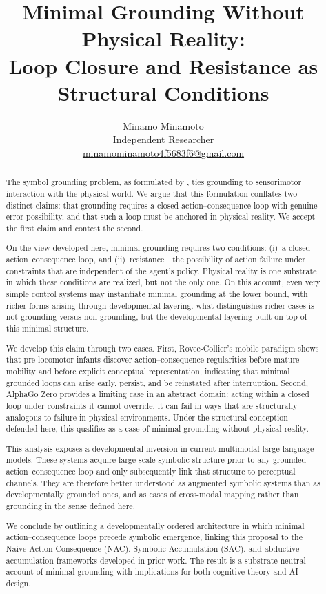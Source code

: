 \documentclass[11pt]{article}
\title{Minimal Grounding Without Physical Reality:\\
Loop Closure and Resistance as Structural Conditions}
\author{Minamo Minamoto\orcidlink{0009-0002-1201-5704}\\
\small Independent Researcher\\
\small \href{mailto:minamominamoto4f5683f6@gmail.com}{minamominamoto4f5683f6@gmail.com}}
\date{}
\begin{document}
\maketitle

\begin{abstract}
The symbol grounding problem, as formulated by \citet{Harnad1990},
ties grounding to sensorimotor interaction with the physical world.
We argue that this formulation conflates two distinct claims: that
grounding requires a closed action--consequence loop with genuine
error possibility, and that such a loop must be anchored in physical
reality. We accept the first claim and contest the second.

On the view developed here, minimal grounding requires two conditions:
(i)~a closed action--consequence loop, and (ii)~resistance---the
possibility of action failure under constraints that are independent
of the agent's policy. Physical reality is one substrate in which
these conditions are realized, but not the only one. On this account,
even very simple control systems may instantiate minimal grounding at the lower bound, with richer forms arising through developmental layering.
what distinguishes richer cases is not grounding versus non-grounding,
but the developmental layering built on top of this minimal structure.

We develop this claim through two cases. First, Rovee-Collier's mobile
paradigm shows that pre-locomotor infants discover action--consequence
regularities before mature mobility and before explicit conceptual
representation, indicating that minimal grounded loops can arise early,
persist, and be reinstated after interruption. Second, AlphaGo Zero
provides a limiting case in an abstract domain: acting within a closed
loop under constraints it cannot override, it can fail in ways that
are structurally analogous to failure in physical environments. Under
the structural conception defended here, this qualifies as a case of
minimal grounding without physical reality.

This analysis exposes a developmental inversion in current multimodal
large language models. These systems acquire large-scale symbolic
structure prior to any grounded action--consequence loop and only
subsequently link that structure to perceptual channels. They are
therefore better understood as augmented symbolic systems than as
developmentally grounded ones, and as cases of cross-modal mapping
rather than grounding in the sense defined here.

We conclude by outlining a developmentally ordered architecture in
which minimal action--consequence loops precede symbolic emergence,
linking this proposal to the Naive Action-Consequence (NAC), Symbolic
Accumulation (SAC), and abductive accumulation frameworks developed in
prior work. The result is a substrate-neutral account of minimal
grounding with implications for both cognitive theory and AI design.
\end{abstract}
\end{document}
